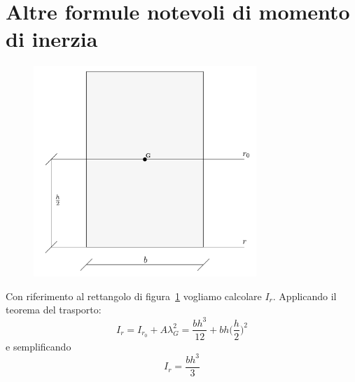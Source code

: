 \section{Altre formule notevoli di momento di inerzia}
\renewcommand{\thefigure}{2~-~7}
\begin{figure}[ht]
\centering
\includegraphics[width=0.75\textwidth]{Immagini/Parte_2/Figura2_7/Figura2_7.pdf}
\caption{}
\label{figura2-7}
\end{figure}
Con riferimento al rettangolo di figura~\ref{figura2-7} vogliamo calcolare $I_r$. Applicando il teorema del trasporto: 
\begin{equation*}
I_r = I_{r_0}+A\lambda_{G}^{2} = \frac{bh^{3}}{12}+bh\biggl(\frac{h}{2}\biggr)^2
\end{equation*}
e semplificando 
\begin{equation} \label{equazione2-8}
\boxed{I_r = \frac{bh^{3}}{3}}
\tag{2.8}
\end{equation}
\renewcommand{\thefigure}{2~-~8}
